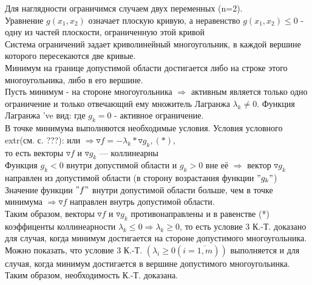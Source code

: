 Для наглядности ограничимся случаем двух переменных (n=2).\\
Уравнение $g(x_1,x_2)$ означает плоскую кривую, а неравенство $g(x_1,x_2) \leq  0$ - одну из частей плоскости, ограниченную этой кривой\\
Система ограничений 
задает криволинейный многоугольник, в каждой вершине которого пересекаются две кривые.\\
Минимум на границе допустимой области достигается либо на строке этого многоугольника, либо в его вершине.\\
Пусть минимум - на стороне многоугольника $\Rightarrow$ активным является только одно ограничение и только отвечающий ему множитель Лагранжа $\lambda_k \neq 0$. Функция Лагранжа 've вид:
 где $g_k=0$ - активное ограничение.\\
В точке минимума выполняются необходимые условия.
Условия условного extr(см. с. ???):
 или 
$\Rightarrow \triangledown f = -\lambda_k * \triangledown g_k , (*)$, \\
то есть векторы $\triangledown f$ и $\triangledown g_k$ --- коллинеарны\\
Функция $g_k < 0$ внутри допустимой области и $g_k > 0$ вне её $\Rightarrow$ вектор $\triangledown g_k$ направлен из допустимой области (в сторону возрастания функции $"g_k"$)\\
Значение функции $"f"$ внутри допустимой области больше, чем в точке минимума $\Rightarrow \triangledown f$ направлен внутрь допустимой области. \\
Таким образом, векторы $\triangledown f$ и $\triangledown g_k$ противонаправлены и в равенстве (*) коэффиценты коллинеарности $\lambda_k \leq 0 \Rightarrow \lambda_k \geq 0 $, то есть условие 3 К.-Т. доказано для случая, когда минимум достигается на стороне допустимого многоугольника.\\
Можно показать, что условие 3 К.-Т. $(\lambda_i \geq 0 (i=\overline{1,m}))$ выполняется и для случая, когда минимум достигается в вершине допустимого многоугольинка.\\
Таким образом, необходимость К.-Т. доказана.

